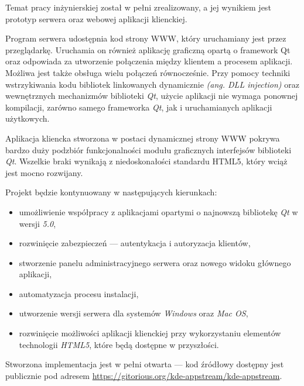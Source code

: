 Temat pracy inżynierskiej został w pełni zrealizowany, a jej wynikiem jest prototyp serwera oraz webowej aplikacji klienckiej. 

Program serwera udostępnia kod strony WWW, który uruchamiany jest przez przeglądarkę. Uruchamia on również aplikację graficzną opartą o framework Qt oraz odpowiada za utworzenie połączenia między klientem a procesem aplikacji. Możliwa jest także obsługa wielu połączeń równocześnie. 
Przy pomocy techniki wstrzykiwania kodu bibliotek linkowanych dynamicznie \emph{(ang. DLL injection)} oraz wewnętrznych mechanizmów biblioteki \emph{Qt}, użycie aplikacji nie wymaga ponownej kompilacji, zarówno samego frameworka \emph{Qt}, jak i uruchamianych aplikacji użytkowych.

Aplikacja kliencka stworzona w postaci dynamicznej strony WWW pokrywa bardzo duży podzbiór funkcjonalności modułu graficznych interfejsów biblioteki \emph{Qt}. Wszelkie braki wynikają z niedoskonałości standardu HTML5, który wciąż jest mocno rozwijany.

Projekt będzie kontynuowany w następujących kierunkach:
\begin{itemize}
  \item umożliwienie współpracy z aplikacjami opartymi o najnowszą bibliotekę \emph{Qt} w wersji \emph{5.0},
  \item rozwinięcie zabezpieczeń --- autentykacja i autoryzacja klientów,
  \item stworzenie panelu administracyjnego serwera oraz nowego widoku głównego aplikacji,
  \item automatyzacja procesu instalacji,
  \item utworzenie wersji serwera dla systemów \emph{Windows} oraz \emph{Mac OS},
  \item rozwinięcie możliwości aplikacji klienckiej przy wykorzystaniu elementów technologii \emph{HTML5}, które będą dostępne w przyszłości.
\end{itemize}

Stworzona implementacja jest w pełni otwarta --- kod źródłowy dostępny jest publicznie pod adresem \url{https://gitorious.org/kde-appstream/kde-appstream}.